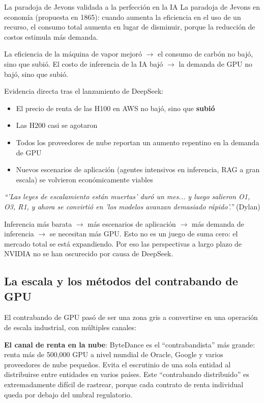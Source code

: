 \documentclass[a4paper]{article}
\begin{document}
\begin{importantbox}{La paradoja de Jevons validada a la perfección en la IA}
La paradoja de Jevons en economía (propuesta en 1865): cuando aumenta la eficiencia en el uso de un recurso, el consumo total aumenta en lugar de disminuir, porque la reducción de costos estimula más demanda.

La eficiencia de la máquina de vapor mejoró $\to$ el consumo de carbón no bajó, sino que subió. El costo de inferencia de la IA bajó $\to$ la demanda de GPU no bajó, sino que subió.

Evidencia directa tras el lanzamiento de DeepSeek:
\begin{itemize}
    \item El precio de renta de las H100 en AWS no bajó, sino que \textbf{subió}
    \item Las H200 casi se agotaron
    \item Todos los proveedores de nube reportan un aumento repentino en la demanda de GPU
    \item Nuevos escenarios de aplicación (agentes intensivos en inferencia, RAG a gran escala) se volvieron económicamente viables
\end{itemize}

\textit{``'Las leyes de escalamiento están muertas' duró un mes... y luego salieron O1, O3, R1, y ahora se convirtió en 'los modelos avanzan demasiado rápido'.''} (Dylan)

Inferencia más barata $\to$ más escenarios de aplicación $\to$ más demanda de inferencia $\to$ se necesitan más GPU. Esto no es un juego de suma cero: el mercado total se está expandiendo. Por eso las perspectivas a largo plazo de NVIDIA no se han oscurecido por causa de DeepSeek.
\end{importantbox}

\subsection{La escala y los métodos del contrabando de GPU}

El contrabando de GPU pasó de ser una zona gris a convertirse en una operación de escala industrial, con múltiples canales:

\textbf{El canal de renta en la nube}: ByteDance es el ``contrabandista'' más grande: renta más de 500,000 GPU a nivel mundial de Oracle, Google y varios proveedores de nube pequeños. Evita el escrutinio de una sola entidad al distribuirse entre entidades en varios países. Este ``contrabando distribuido'' es extremadamente difícil de rastrear, porque cada contrato de renta individual queda por debajo del umbral regulatorio.
\end{document}
